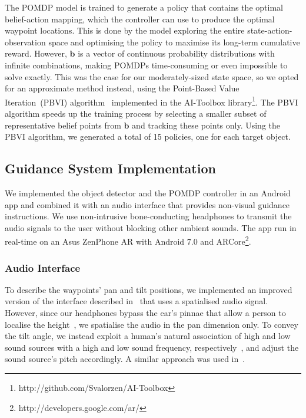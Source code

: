 \documentclass[runningheads]{llncs}
\begin{document}
The POMDP model is trained to generate a policy that contains the optimal belief-action mapping, which the controller can use to produce the optimal waypoint locations.
This is done by the model exploring the entire state-action-observation space and optimising the policy to maximise its long-term cumulative reward.
However, $\mathbf{b}$ is a vector of continuous probability distributions with infinite combinations, making POMDPs time-consuming or even impossible to solve exactly.
This was the case for our moderately-sized state space, so we opted for an approximate method instead, using the Point-Based Value Iteration~(PBVI) algorithm~\cite{pineau2003point} implemented in the AI-Toolbox library\footnote{http://github.com/Svalorzen/AI-Toolbox}.
The PBVI algorithm speeds up the training process by selecting a smaller subset of representative belief points from $\mathbf{b}$ and tracking these points only. 
Using the PBVI algorithm, we generated a total of 15 policies, one for each target object. 

\subsection{Guidance System Implementation}

We implemented the object detector and the POMDP controller in an Android app and combined it with an audio interface that provides non-visual guidance instructions.
We use non-intrusive bone-conducting headphones to transmit the audio signals to the user without blocking other ambient sounds.
The app run in real-time on an Asus ZenPhone AR with Android 7.0 and ARCore\footnote{http://developers.google.com/ar/}.%

\subsubsection{Audio Interface}
To describe the waypoints' pan and tilt positions, we implemented an improved version of the interface described in~\cite{bellotto2013} that uses a spatialised audio signal.
However, since our headphones bypass the ear's pinnae that allow a person to localise the height~\cite{roffler1968factors}, we spatialise the audio in the pan dimension only.
To convey the tilt angle, we instead exploit a human's natural association of high and low sound sources with a high and low sound frequency, respectively~\cite{blauert1997spatial}, and adjust the sound source's pitch accordingly. 
A similar approach was used in~\cite{schauerte2012assistive}.
\end{document}
